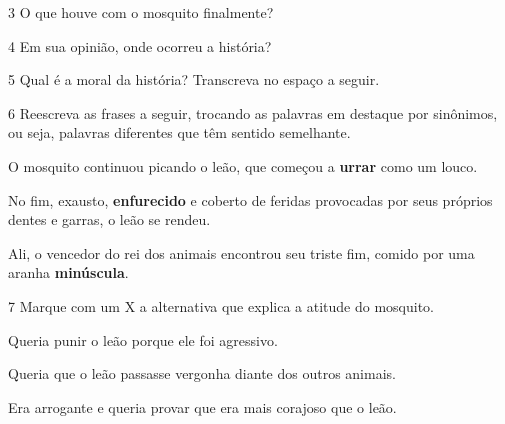 
\num{3} O que houve com o mosquito finalmente?


\num{4} Em sua opinião, onde ocorreu a história?


\num{5} Qual é a moral da história? Transcreva no espaço a seguir.


\num{6} Reescreva as frases a seguir, trocando as palavras em destaque por
sinônimos, ou seja, palavras diferentes que têm sentido
semelhante.


\begin{escolha}[itemsep=-5pt]
\item O mosquito continuou picando o leão, que começou a \textbf{urrar}
como um louco. 
\item{}

\item No fim, exausto, \textbf{enfurecido} e coberto de feridas provocadas por seus próprios dentes e garras, o leão se rendeu.
\item{}


\item Ali, o vencedor do rei dos animais encontrou seu triste fim,
comido por uma aranha \textbf{minúscula}.
\item{}
\end{escolha}

\num{7} Marque com um X a alternativa que explica a atitude do mosquito.

\begin{boxlist}
 Queria punir o leão porque ele foi agressivo.

 Queria que o leão passasse vergonha diante dos outros animais.

 Era arrogante e queria provar que era mais corajoso que o leão.
\end{boxlist}

